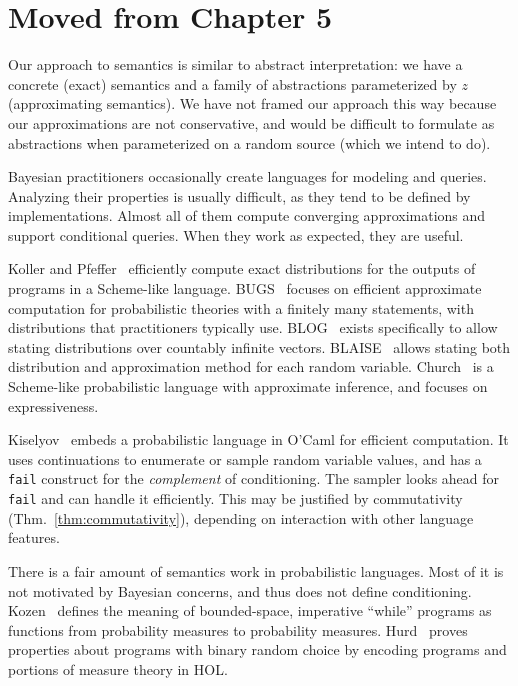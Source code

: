 \section{Moved from Chapter 5}

Our approach to semantics is similar to abstract interpretation: we have a concrete (exact) semantics and a family of abstractions parameterized by $z$ (approximating semantics). We have not framed our approach this way because our approximations are not conservative, and would be difficult to formulate as abstractions when parameterized on a random source (which we intend to do).

Bayesian practitioners occasionally create languages for modeling and queries. Analyzing their properties is usually difficult, as they tend to be defined by implementations. Almost all of them compute converging approximations and support conditional queries. When they work as expected, they are useful.

Koller and Pfeffer~\cite{cit:koller-1997aaai-bayes-programs-short} efficiently compute exact distributions for the outputs of programs in a Scheme-like language. BUGS~\cite{cit:winbugs-language-short} focuses on efficient approximate computation for probabilistic theories with a finitely many statements, with distributions that practitioners typically use. BLOG~\cite{cit:blog-language-short} exists specifically to allow stating distributions over countably infinite vectors. BLAISE~\cite{cit:blaise-language} allows stating both distribution and approximation method for each random variable. Church~\cite{cit:church-language-short} is a Scheme-like probabilistic language with approximate inference, and focuses on expressiveness.

Kiselyov~\cite{cit:kiselyov-2008uai-monolingual} embeds a probabilistic language in O'Caml for efficient computation. It uses continuations to enumerate or sample random variable values, and has a \texttt{fail} construct for the \textit{complement} of conditioning. The sampler looks ahead for \texttt{fail} and can handle it efficiently. This may be justified by commutativity (Thm.~\ref{thm:commutativity}), depending on interaction with other language features.

There is a fair amount of semantics work in probabilistic languages. Most of it is not motivated by Bayesian concerns, and thus does not define conditioning. Kozen~\cite{cit:kozen-1979fcs-prob-programs-short} defines the meaning of bounded-space, imperative ``while'' programs as functions from probability measures to probability measures. Hurd~\cite{cit:hurd-2002thesis} proves properties about programs with binary random choice by encoding programs and portions of measure theory in HOL.

